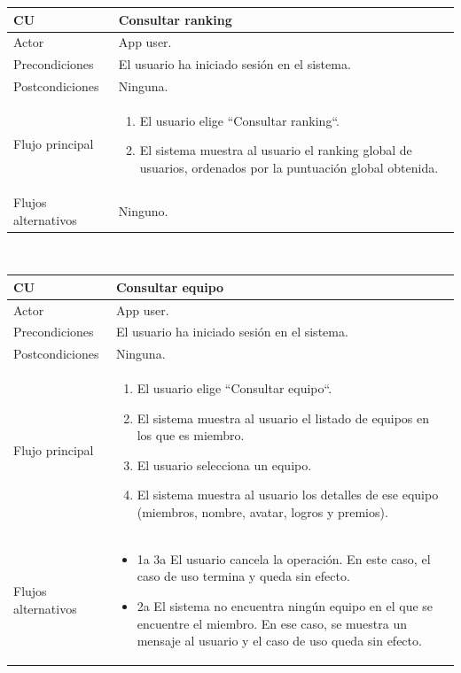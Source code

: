 \documentclass[twoside]{report}
\newcommand\addrow[2]{#1 &#2\\ }
\newcommand\addheading[2]{#1 &#2\\ \hline}
\newcommand\tabularhead{\begin{tabular}{lp{0.7\textwidth}}
\hline
}
\newenvironment{usecase}{\tabularhead}
{\hline\end{tabular}}
\begin{document}
\vspace{0.5cm}

\begin{usecase}
  \addheading{\textbf{CU\arabic{usecase}}}{Consultar ranking} 
  \addrow{Actor}{App user.}
  \addrow{Precondiciones}{El usuario ha iniciado sesión en el sistema.}
  \addrow{Postcondiciones}{Ninguna.}
  \addrow{Flujo principal}{
  		\begin{enumerate}
  		\item El usuario elige “Consultar ranking“.
  		\item El sistema muestra al usuario el ranking global de usuarios, ordenados por la puntuación global obtenida.
  		\end{enumerate}
  }
  \addrow{Flujos alternativos}{Ninguno.}
\end{usecase}\\

\vspace{0.5cm}

\begin{usecase}
  \addheading{\textbf{CU\arabic{usecase}}}{Consultar equipo} 
  \addrow{Actor}{App user.}
  \addrow{Precondiciones}{El usuario ha iniciado sesión en el sistema.}
  \addrow{Postcondiciones}{Ninguna.}
  \addrow{Flujo principal}{
  		\begin{enumerate}
  		\item El usuario elige “Consultar equipo“. %
  		\item El sistema muestra al usuario el listado de equipos en los que es miembro. %
  		\item El usuario selecciona un equipo. %
  		\item El sistema muestra al usuario los detalles de ese equipo (miembros, nombre, avatar, logros y premios). %
  		\end{enumerate}
  }
  \addrow{Flujos alternativos}{
  		\begin{itemize}
  		\item 1a 3a El usuario cancela la operación. En este caso, el caso de uso termina y queda sin efecto.
  		\item 2a El sistema no encuentra ningún equipo en el que se encuentre el miembro. En ese caso, se muestra un mensaje al usuario y el caso de uso queda sin efecto.
  		\end{itemize}
  }
\end{usecase}\\

\vspace{0.5cm}
\end{document}
